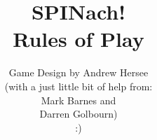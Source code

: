 \title{
SPINach!\\
Rules of Play
}
\date{}
\author{
Game Design by Andrew Hersee\\
(with a just little bit of help from:\\
Mark Barnes and\\
Darren Golbourn)\\
:)
}
